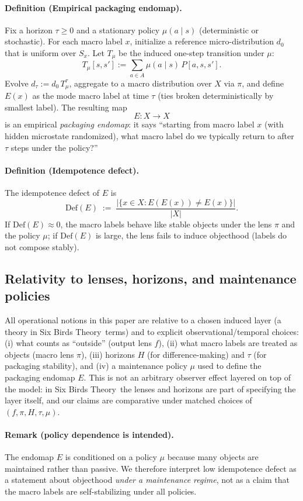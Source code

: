 \documentclass[11pt]{article}
\newcommand{\SBT}{Six Birds Theory}
\begin{document}
\paragraph{Definition (Empirical packaging endomap).}
Fix a horizon $\tau\ge 0$ and a stationary policy $\mu(a\mid s)$ (deterministic or stochastic). For each macro label $x$, initialize a reference micro-distribution $d_0$ that is uniform over $S_x$. Let $T_\mu$ be the induced one-step transition under $\mu$:
\[
T_\mu[s,s'] := \sum_{a\in A} \mu(a\mid s)\,P[a,s,s'].
\]
Evolve $d_\tau := d_0\,T_\mu^\tau$, aggregate to a macro distribution over $X$ via $\pi$, and define $E(x)$ as the mode macro label at time $\tau$ (ties broken deterministically by smallest label). The resulting map
\[
E: X\to X
\]
is an empirical \emph{packaging endomap}: it says ``starting from macro label $x$ (with hidden microstate randomized), what macro label do we typically return to after $\tau$ steps under the policy?''

\paragraph{Definition (Idempotence defect).}
The idempotence defect of $E$ is
\[
\mathrm{Def}(E) \;:=\; \frac{|\{x\in X: E(E(x))\neq E(x)\}|}{|X|}.
\]
If $\mathrm{Def}(E)\approx 0$, the macro labels behave like stable objects under the lens $\pi$ and the policy $\mu$; if $\mathrm{Def}(E)$ is large, the lens fails to induce objecthood (labels do not compose stably).

\subsection{Relativity to lenses, horizons, and maintenance policies}
All operational notions in this paper are relative to a chosen induced layer (a theory in \SBT\ terms) and to explicit observational/temporal choices: (i) what counts as ``outside'' (output lens $f$), (ii) what macro labels are treated as objects (macro lens $\pi$), (iii) horizons $H$ (for difference-making) and $\tau$ (for packaging stability), and (iv) a maintenance policy $\mu$ used to define the packaging endomap $E$. This is not an arbitrary observer effect layered on top of the model: in \SBT\ the lenses and horizons are part of specifying the layer itself, and our claims are comparative under matched choices of $(f,\pi,H,\tau,\mu)$.

\paragraph{Remark (policy dependence is intended).}
The endomap $E$ is conditioned on a policy $\mu$ because many objects are maintained rather than passive. We therefore interpret low idempotence defect as a statement about objecthood \emph{under a maintenance regime}, not as a claim that the macro labels are self-stabilizing under all policies.
\end{document}
